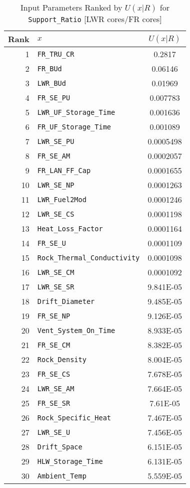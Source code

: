 \begin{center}
\begin{table}[htbp]
\caption{Input Parameters Ranked by $U(x|R)$ for \texttt{Support\_Ratio} [LWR cores/FR cores]}
\label{U_x_R_for_Support_Ratio_with_IJK7}
\begin{center}
\begin{tabular}{|r|l|c|}
\hline
Rank&\textbf{$x$}&\textbf{$U(x|R)$}\\
\hline
1&\texttt{FR\_TRU\_CR}&0.2817\\
\hline
2&\texttt{FR\_BUd}&0.06146\\
\hline
3&\texttt{LWR\_BUd}&0.01969\\
\hline
4&\texttt{FR\_SE\_PU}&0.007783\\
\hline
5&\texttt{LWR\_UF\_Storage\_Time}&0.001636\\
\hline
6&\texttt{FR\_UF\_Storage\_Time}&0.001089\\
\hline
7&\texttt{LWR\_SE\_PU}&0.0005498\\
\hline
8&\texttt{FR\_SE\_AM}&0.0002057\\
\hline
9&\texttt{FR\_LAN\_FF\_Cap}&0.0001655\\
\hline
10&\texttt{LWR\_SE\_NP}&0.0001263\\
\hline
11&\texttt{LWR\_Fuel2Mod}&0.0001246\\
\hline
12&\texttt{LWR\_SE\_CS}&0.0001198\\
\hline
13&\texttt{Heat\_Loss\_Factor}&0.0001164\\
\hline
14&\texttt{FR\_SE\_U}&0.0001109\\
\hline
15&\texttt{Rock\_Thermal\_Conductivity}&0.0001098\\
\hline
16&\texttt{LWR\_SE\_CM}&0.0001092\\
\hline
17&\texttt{LWR\_SE\_SR}&9.841E-05\\
\hline
18&\texttt{Drift\_Diameter}&9.485E-05\\
\hline
19&\texttt{FR\_SE\_NP}&9.126E-05\\
\hline
20&\texttt{Vent\_System\_On\_Time}&8.933E-05\\
\hline
21&\texttt{FR\_SE\_CM}&8.382E-05\\
\hline
22&\texttt{Rock\_Density}&8.004E-05\\
\hline
23&\texttt{FR\_SE\_CS}&7.678E-05\\
\hline
24&\texttt{LWR\_SE\_AM}&7.664E-05\\
\hline
25&\texttt{FR\_SE\_SR}&7.61E-05\\
\hline
26&\texttt{Rock\_Specific\_Heat}&7.467E-05\\
\hline
27&\texttt{LWR\_SE\_U}&7.456E-05\\
\hline
28&\texttt{Drift\_Space}&6.151E-05\\
\hline
29&\texttt{HLW\_Storage\_Time}&6.131E-05\\
\hline
30&\texttt{Ambient\_Temp}&5.559E-05\\
\hline
\end{tabular}
\end{center}
\end{table}
\end{center}

